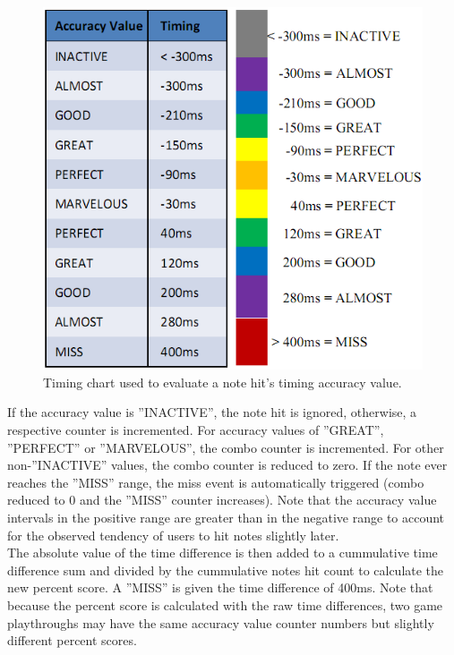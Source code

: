 \documentclass{sig-alternate}
\begin{document}
\begin{figure}[htb!]
	\begin{center}
		\includegraphics[width=1\linewidth]{figure_prototype_timings}
	\end{center}
	\vspace{-12pt}
	\caption{Timing chart used to evaluate a note hit's timing accuracy value.}
	\label{fig:prototype_timings}
\end{figure}

If the accuracy value is ''INACTIVE'', the note hit is ignored, otherwise, a respective counter is incremented. For accuracy values of ''GREAT'', ''PERFECT'' or ''MARVELOUS'', the combo counter is incremented. For other non-''INACTIVE'' values, the combo counter is reduced to zero. If the note ever reaches the ''MISS'' range, the miss event is automatically triggered (combo reduced to 0 and the ''MISS'' counter increases). Note that the accuracy value intervals in the positive range are greater than in the negative range to account for the observed tendency of users to hit notes slightly later.\\

The absolute value of the time difference is then added to a cummulative time difference sum and divided by the cummulative notes hit count to calculate the new percent score. A ''MISS'' is given the time difference of 400ms. Note that because the percent score is calculated with the raw time differences, two game playthroughs may have the same accuracy value counter numbers but slightly different percent scores. \\
\end{document}
